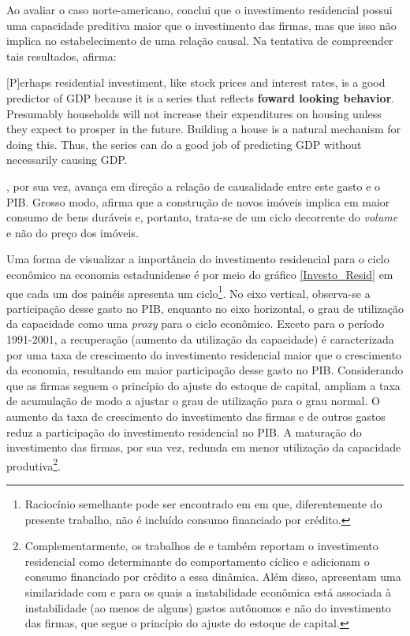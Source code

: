 Ao avaliar o caso norte-americano, \textcite{green_follow_1997} conclui que o investimento residencial possui uma capacidade preditiva maior que o investimento das firmas, mas que isso não implica no estabelecimento de uma relação causal. Na tentativa de compreender tais resultados, afirma:

\begin{citacao}

[P]erhaps residential investiment, like stock prices and interest rates, is a good predictor of GDP because it is a series that reflects \textbf{foward looking behavior}. Presumably households will not increase their expenditures on housing unless they expect to prosper in the future. Building a house is a natural mechanism for doing this. Thus, the series can do a good job of predicting GDP without necessarily causing GDP.
\cite[p.~267, grifos adicionados]{green_follow_1997}
\end{citacao}
\textcite{leamer_housing_2007}, por sua vez, avança em direção a relação de causalidade entre este gasto e o PIB. Grosso modo, afirma que a construção de novos imóveis implica em maior consumo de bens duráveis e, portanto, trata-se de um ciclo decorrente do \textit{volume} e não do preço dos imóveis. 

Uma forma de visualizar a importância do investimento residencial para o ciclo econômico na economia estadunidense é por meio do gráfico \ref{Investo_Resid} em que cada um dos painéis apresenta um ciclo\footnote{
	Raciocínio semelhante pode ser encontrado em \textcite{fiebiger_semi-autonomous_2018} em que, diferentemente do presente trabalho, não é incluído consumo financiado por crédito.}. 
No eixo vertical, observa-se a participação desse gasto no PIB, enquanto no eixo horizontal, o grau de utilização da capacidade como uma \textit{proxy} para o ciclo econômico. Exceto para o período 1991-2001, a recuperação (aumento da utilização da capacidade) é caracterizada por uma taxa de crescimento do investimento residencial maior que o crescimento da economia, resultando em maior participação desse gasto no PIB. Considerando que as firmas seguem o princípio do ajuste do estoque de capital, ampliam a taxa de acumulação de modo a ajustar o grau de utilização para o grau normal. O aumento da taxa de crescimento do investimento das firmas e de outros gastos reduz a participação do investimento residencial no PIB. A maturação do investimento das firmas, por sua vez, redunda em menor utilização da capacidade produtiva\footnote{
	Complementarmente, os trabalhos de \textcite{fiebiger_semi-autonomous_2018} e \textcite{fiebiger_trend_2017} também reportam o investimento residencial como determinante do comportamento cíclico e adicionam o consumo financiado por crédito a essa dinâmica. Além disso, apresentam uma similaridade com \textcite{dejuan_hidden_2017} e \textcite{teixeira_crescimento_2015} para os quais a instabilidade econômica está associada à instabilidade (ao menos de alguns) gastos autônomos e não do investimento das firmas, que segue o princípio do ajuste do estoque de capital.}. 

